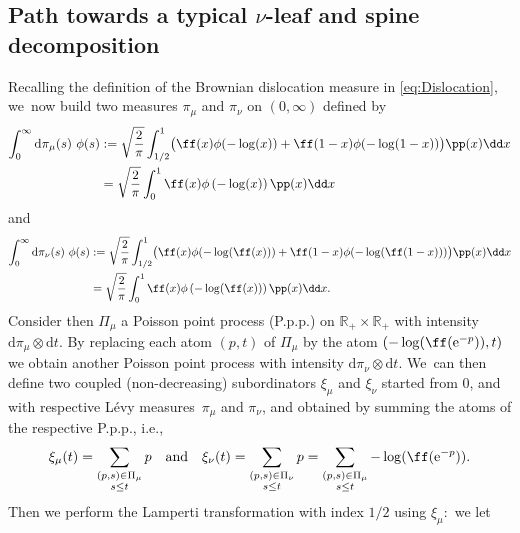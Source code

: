 \subsection{Path towards a typical $\nu$-leaf and spine decomposition}
Recalling the definition of the Brownian dislocation measure in \eqref{eq:Dislocation}, we~now build two measures $\pi_\mu$ and $\pi_\nu$ on $(0,\infty)$ defined by
\begin{align*}
\int_{0}^{\infty} \mathrm{d} \pi_\mu(s) \ \phi(s) &:= \sqrt{\frac{2}{\pi}} \int_{1/2}^{1} \bigl(\ff(x) \phi(-\log (x)) + \ff(1-x) \phi(-\log (1-x))\bigr)\pp(x)\dd x \\
&= \sqrt{\frac{2}{\pi}} \int_0^{1} \ff(x) \phi\left(-\log (x)\right) \pp(x)\dd x
\end{align*}
and
\begin{align*} \int_{0}^{\infty} \mathrm{d} \pi_\nu(s) \ \phi(s) &:= \sqrt{\frac{2}{\pi}} \int_{1/2}^{1}\bigl(\ff(x) \phi(-\log (\ff(x))) + \ff(1-x) \phi(-\log (\ff(1-x)))\bigr)\pp(x)\dd x \\
&= \sqrt{\frac{2}{\pi}} \int_0^{1} \ff(x) \phi\left(-\log (\ff(x))\right)\pp(x)\dd x.
\end{align*}
Consider then $\Pi_\mu$ a Poisson point process (P.p.p.) on $ \mathbb{R}_+ \!\times\! \mathbb{R}_+$ with intensity \hbox{$ \mathrm{d} \pi_\mu \!\otimes\! \mathrm{d}t$}. By replacing each atom $(p,t)$ of $\Pi_\mu$ by the atom $(-\log(\ff (\mathrm{e}^{-p})),t)$ we obtain another Poisson point process with intensity $ \mathrm{d}\pi_\nu \otimes \mathrm{d}t$. We~can then define two coupled (non-decreasing) subordinators $\xi_\mu$ and $\xi_\nu$ started from $0$, and with respective Lévy measures~$\pi_\mu$ and $\pi_\nu$, and obtained by summing the atoms of the respective P.p.p., i.e.,
\begin{equation}\label{defxi}
\xi_\mu(t) = \sum_{\begin{subarray}{c}(p,s) \in \Pi_\mu \\ s \leq t\end{subarray}} p \quad \text{and} \quad \xi_\nu(t) = \sum_{\begin{subarray}{c}(p,s) \in \Pi_\nu \\ s \leq t
\end{subarray}} p = \sum_{\begin{subarray}{c}(p,s) \in \Pi_\mu \\ s \leq t\end{subarray}} -\log(\ff (\mathrm{e}^{-p})).\end{equation}
Then we perform the Lamperti transformation with index $1/2$ using $\xi_\mu:$ we let
